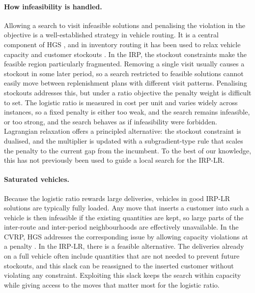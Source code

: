 \paragraph{How infeasibility is handled.}
Allowing a search to visit infeasible solutions and penalising the violation
in the objective is a well-established strategy in vehicle routing. It is a
central component of HGS \citep{vidal2022hybrid}, and in inventory routing
it has been used to relax vehicle capacity
\citep{archetti2012hybrid,castro2026hybrid} and customer stockouts
\citep{zhao2025large}. In the IRP, the stockout constraints make the
feasible region particularly fragmented. Removing a single visit usually
causes a stockout in some later period, so a search restricted to feasible
solutions cannot easily move between replenishment plans with different
visit patterns. Penalising stockouts addresses this, but under a ratio
objective the penalty weight is difficult to set. The logistic ratio is
measured in cost per unit and varies widely across instances, so a fixed
penalty is either too weak, and the search remains infeasible, or too
strong, and the search behaves as if infeasibility were forbidden. Lagrangian
relaxation \citep{fisher1981lagrangian} offers a principled alternative: the
stockout constraint is dualised, and the multiplier is updated with a
subgradient-type rule that scales the penalty to the current gap from the
incumbent. To the best of our knowledge, this has not previously been used
to guide a local search for the IRP-LR.

\paragraph{Saturated vehicles.}
Because the logistic ratio rewards large deliveries, vehicles in good
IRP-LR solutions are typically fully loaded. Any move that inserts a
customer into such a vehicle is then infeasible if the existing quantities
are kept, so large parts of the inter-route and inter-period neighbourhoods
are effectively unavailable. In the CVRP, HGS addresses the corresponding
issue by allowing capacity violations at a penalty \citep{vidal2022hybrid}.
In the IRP-LR, there is a feasible alternative. The deliveries already on a
full vehicle often include quantities that are not needed to prevent future
stockouts, and this slack can be reassigned to the inserted customer without
violating any constraint. Exploiting this slack keeps the search within
capacity while giving access to the moves that matter most for the
logistic ratio.

